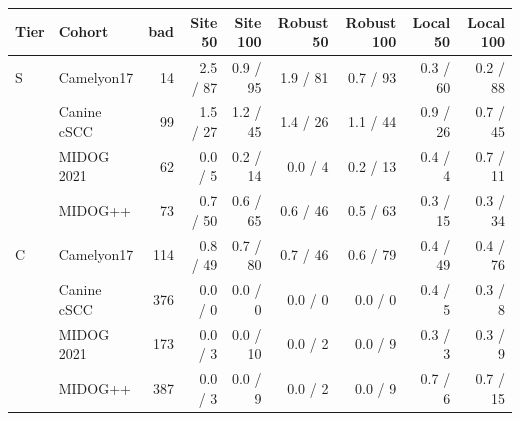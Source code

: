 \begin{tabular*}{\tblwidth}{@{\extracolsep{\fill}}llrrrrrrr@{}}
\toprule
Tier & Cohort & bad & Site 50 & Site 100 & Robust 50 & Robust 100 & Local 50 & Local 100 \\
\midrule
S & Camelyon17 & 14 & 2.5 / 87 & 0.9 / 95 & 1.9 / 81 & 0.7 / 93 & 0.3 / 60 & 0.2 / 88 \\
 & Canine cSCC & 99 & 1.5 / 27 & 1.2 / 45 & 1.4 / 26 & 1.1 / 44 & 0.9 / 26 & 0.7 / 45 \\
 & MIDOG 2021 & 62 & 0.0 / 5 & 0.2 / 14 & 0.0 / 4 & 0.2 / 13 & 0.4 / 4 & 0.7 / 11 \\
 & MIDOG++ & 73 & 0.7 / 50 & 0.6 / 65 & 0.6 / 46 & 0.5 / 63 & 0.3 / 15 & 0.3 / 34 \\
\addlinespace[3pt]
C & Camelyon17 & 114 & 0.8 / 49 & 0.7 / 80 & 0.7 / 46 & 0.6 / 79 & 0.4 / 49 & 0.4 / 76 \\
 & Canine cSCC & 376 & 0.0 / 0 & 0.0 / 0 & 0.0 / 0 & 0.0 / 0 & 0.4 / 5 & 0.3 / 8 \\
 & MIDOG 2021 & 173 & 0.0 / 3 & 0.0 / 10 & 0.0 / 2 & 0.0 / 9 & 0.3 / 3 & 0.3 / 9 \\
 & MIDOG++ & 387 & 0.0 / 3 & 0.0 / 9 & 0.0 / 2 & 0.0 / 9 & 0.7 / 6 & 0.7 / 15 \\
\bottomrule
\end{tabular*}
